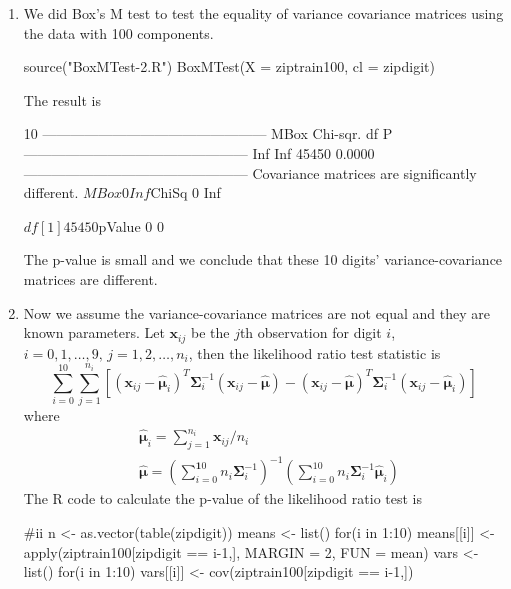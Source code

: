 \documentclass{article}
\begin{document}
\begin{enumerate}[leftmargin = 0 em, label = \arabic*., font = \bfseries]
\begin{enumerate}
		\begin{enumerate}
			\item 
			We did Box's M test to test the equality of variance covariance matrices using the data with 100 components.
			\begin{rcode}
source("BoxMTest-2.R")
BoxMTest(X = ziptrain100, cl = zipdigit)
			\end{rcode}
			The result is
			\begin{rcode}
[1] 10
------------------------------------------------
 MBox Chi-sqr. df P
------------------------------------------------
       Inf        Inf       45450       0.0000
------------------------------------------------
Covariance matrices are significantly different.
$MBox
  0 
Inf 

$ChiSq
  0 
Inf 

$df
[1] 45450

$pValue
0 
0 

			\end{rcode}
			The p-value is small and we conclude that these 10 digits' variance-covariance matrices are different.

			\item 
			Now we assume the variance-covariance matrices are not equal and they are known parameters. Let $\bm x_{ij}$ be the $j$th observation for digit $i$, $i = 0,1, \ldots, 9,\, j = 1, 2, \ldots, n_i$, then the likelihood ratio test statistic is
			\[\sum_{i=0}^{10} \sum_{j=1}^{n_i}\left[(\bm x_{ij} - \hat{\bm \mu}_{i})^T \bm \Sigma_{i}^{-1}(\bm x_{ij} - \hat{\bm \mu}) - (\bm x_{ij} - \hat{\bm \mu})^T \bm \Sigma_{i}^{-1}(\bm x_{ij} - \hat{\bm \mu}_{i})\right]\]
			where
			\begin{align*}
			& \hat{\bm \mu}_i = \sum_{j=1}^{n_i}\bm x_{ij}/n_{i}\\
			& \hat{\bm \mu} = \left(\sum_{i=0}^{\bm 10} n_{i} \bm \Sigma_{i}^{-1}\right)^{-1} \left(\sum_{i = 0}^{10} n_i \bm \Sigma_{i}^{-1} \hat{\bm \mu}_i\right)
			\end{align*}
			The R code to calculate the p-value of the likelihood ratio test is
			\begin{rcode}
			#ii
n <- as.vector(table(zipdigit))
means <- list()
for(i in 1:10){
  means[[i]] <- apply(ziptrain100[zipdigit == i-1,], MARGIN = 2, FUN = mean)
}
vars <- list()
for(i in 1:10){
  vars[[i]] <- cov(ziptrain100[zipdigit == i-1,])
}


\end{rcode}
\end{enumerate}
\end{enumerate}
\end{enumerate}
\end{document}
